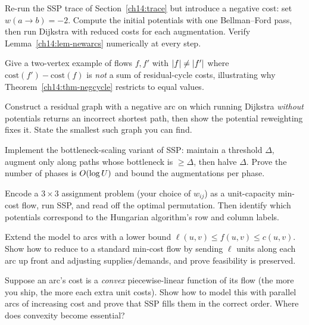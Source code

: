 \begin{exercise}
Re-run the SSP trace of Section~\ref{ch14:trace} but introduce a negative cost: set $w(a\!\to\!b)=-2$. Compute the initial potentials with one Bellman--Ford pass, then run Dijkstra with reduced costs for each augmentation. Verify Lemma~\ref{ch14:lem-newarcs} numerically at every step.
\end{exercise}

\begin{exercise}
Give a two-vertex example of flows $f,f'$ with $\lvert f\rvert\ne\lvert f'\rvert$ where $\mathrm{cost}(f')-\mathrm{cost}(f)$ is \emph{not} a sum of residual-cycle costs, illustrating why Theorem~\ref{ch14:thm-negcycle} restricts to equal values.
\end{exercise}

\begin{exercise}
Construct a residual graph with a negative arc on which running Dijkstra \emph{without} potentials returns an incorrect shortest path, then show the potential reweighting fixes it. State the smallest such graph you can find.
\end{exercise}

\begin{exercise}
Implement the bottleneck-scaling variant of SSP: maintain a threshold $\Delta$, augment only along paths whose bottleneck is $\ge\Delta$, then halve $\Delta$. Prove the number of phases is $O(\log U)$ and bound the augmentations per phase.
\end{exercise}

\begin{exercise}[Assignment $=$ flow]
Encode a $3\times 3$ assignment problem (your choice of $w_{ij}$) as a unit-capacity min-cost flow, run SSP, and read off the optimal permutation. Then identify which potentials correspond to the Hungarian algorithm's row and column labels.
\end{exercise}

\begin{exercise}
Extend the model to arcs with a lower bound $\ell(u,v)\le f(u,v)\le c(u,v)$. Show how to reduce to a standard min-cost flow by sending $\ell$ units along each arc up front and adjusting supplies/demands, and prove feasibility is preserved.
\end{exercise}

\begin{exercise}
Suppose an arc's cost is a \emph{convex} piecewise-linear function of its flow (the more you ship, the more each extra unit costs). Show how to model this with parallel arcs of increasing cost and prove that SSP fills them in the correct order. Where does convexity become essential?
\end{exercise}

